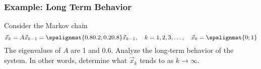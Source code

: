 \begin{frame}\frametitle{Example: Long Term Behavior}


    Consider the Markov chain $$\vec x_k = A\vec x_{k-1} = \spalignmat{0.8 0.2 ;0.2 0.8 }\vec x_{k-1}, \quad k= 1, 2, 3, \ldots, \quad \vec x_0 = \spalignmat{0;1}$$ The eigenvalues of $A$ are 1 and 0.6. Analyze the long-term behavior of the system. In other words, determine what $\vec x_k$ tends to as $k\to\infty$. 


\end{frame}


